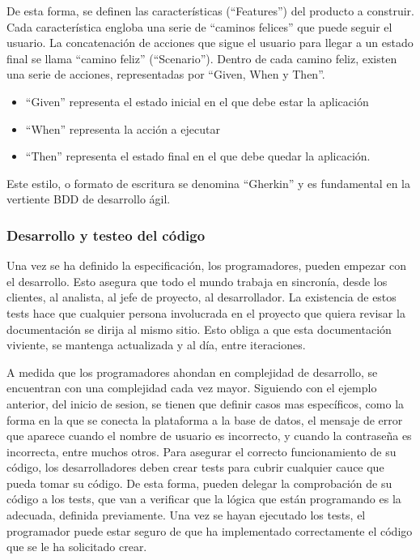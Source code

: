 \documentclass[12pt]{report} %
\begin{document}
De esta forma, se definen las características (``Features'') del producto a
construir.  Cada característica engloba una serie de ``caminos felices'' que
puede seguir el usuario.  La concatenación de acciones que sigue el usuario para
llegar a un estado final se llama ``camino feliz'' (``Scenario'').  Dentro de
cada camino feliz, existen una serie de acciones, representadas por ``Given,
When y Then''.

\begin{itemize} \item{``Given'' representa el estado inicial en el que debe
estar la aplicación} \item{``When'' representa la acción a ejecutar}
\item{``Then'' representa el estado final en el que debe quedar la aplicación.}
\end{itemize}

Este estilo, o formato de escritura se denomina ``Gherkin'' y es fundamental en
la vertiente BDD de desarrollo ágil.

\subsubsection{Desarrollo y testeo del código}

Una vez se ha definido la especificación, los programadores, pueden empezar con
el desarrollo.  Esto asegura que todo el mundo trabaja en sincronía, desde los
clientes, al analista, al jefe de proyecto, al desarrollador.  La existencia de
estos tests hace que cualquier persona involucrada en el proyecto que quiera
revisar la documentación se dirija al mismo sitio.  Esto obliga a que esta
documentación viviente, se mantenga actualizada y al día, entre iteraciones.

A medida que los programadores ahondan en complejidad de desarrollo, se
encuentran con una complejidad cada vez mayor.  Siguiendo con el ejemplo
anterior, del inicio de sesion, se tienen que definir casos mas específicos,
como la forma en la que se conecta la plataforma a la base de datos, el mensaje
de error que aparece cuando el nombre de usuario es incorrecto, y cuando la
contraseña es incorrecta, entre muchos otros.  Para asegurar el correcto
funcionamiento de su código, los desarrolladores deben crear tests para cubrir
cualquier cauce que pueda tomar su código.  De esta forma, pueden delegar la
comprobación de su código a los tests, que van a verificar que la lógica que
están programando es la adecuada, definida previamente.  Una vez se hayan
ejecutado los tests, el programador puede estar seguro de que ha implementado
correctamente el código que se le ha solicitado crear.
\end{document}
